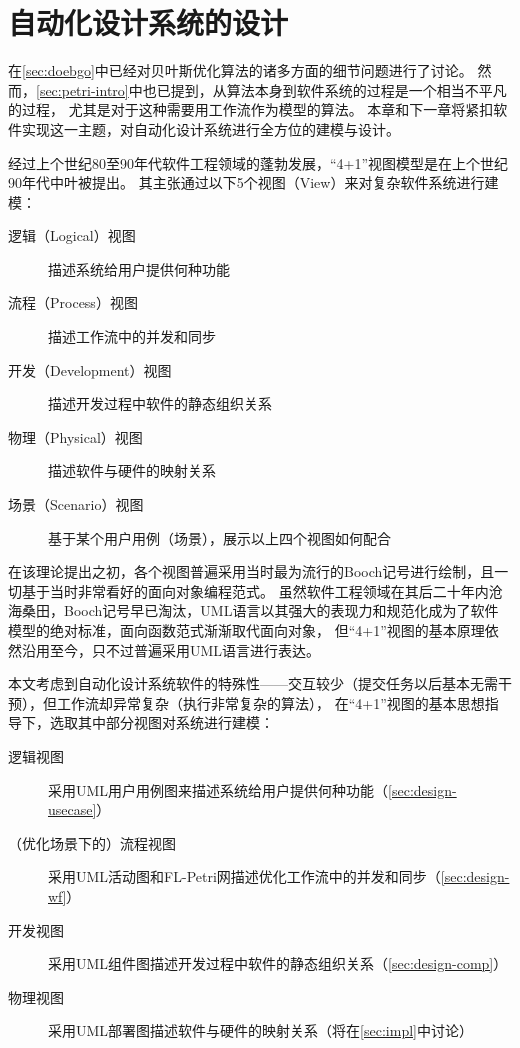 \documentclass[index]{subfiles}
\begin{document}
\chapter{自动化设计系统的设计}\label{sec:design}
在\cref{sec:doebgo}中已经对贝叶斯优化算法的诸多方面的细节问题进行了讨论。
然而，\cref{sec:petri-intro}中也已提到，从算法本身到软件系统的过程是一个相当不平凡的过程，
尤其是对于这种需要用工作流作为模型的算法。
本章和下一章将紧扣软件实现这一主题，对自动化设计系统进行全方位的建模与设计。

经过上个世纪80至90年代软件工程领域的蓬勃发展，“4+1”视图模型\cite{kruchten1995}是在上个世纪90年代中叶被提出。
其主张通过以下5个视图（View）来对复杂软件系统进行建模：
\begin{description}
  \item[逻辑（Logical）视图] 描述系统给用户提供何种功能
  \item[流程（Process）视图] 描述工作流中的并发和同步
  \item[开发（Development）视图] 描述开发过程中软件的静态组织关系
  \item[物理（Physical）视图] 描述软件与硬件的映射关系
  \item[场景（Scenario）视图] 基于某个用户用例（场景），展示以上四个视图如何配合
\end{description}

在该理论提出之初，各个视图普遍采用当时最为流行的Booch记号进行绘制，且一切基于当时非常看好的面向对象编程范式。
虽然软件工程领域在其后二十年内沧海桑田，Booch记号早已淘汰，UML语言以其强大的表现力和规范化成为了软件模型的绝对标准，面向函数范式渐渐取代面向对象，
但“4+1”视图的基本原理依然沿用至今，只不过普遍采用UML语言进行表达。

本文考虑到自动化设计系统软件的特殊性——交互较少（提交任务以后基本无需干预），但工作流却异常复杂（执行非常复杂的算法），
在“4+1”视图的基本思想指导下，选取其中部分视图对系统进行建模：
\begin{description}
  \item[逻辑视图] 采用UML用户用例图来描述系统给用户提供何种功能（\cref{sec:design-usecase}）
  \item[（优化场景下的）流程视图] 采用UML活动图和FL-Petri网描述优化工作流中的并发和同步（\cref{sec:design-wf}）
  \item[开发视图] 采用UML组件图描述开发过程中软件的静态组织关系（\cref{sec:design-comp}）
  \item[物理视图] 采用UML部署图描述软件与硬件的映射关系（将在\cref{sec:impl}中讨论）
\end{description}
\end{document}
